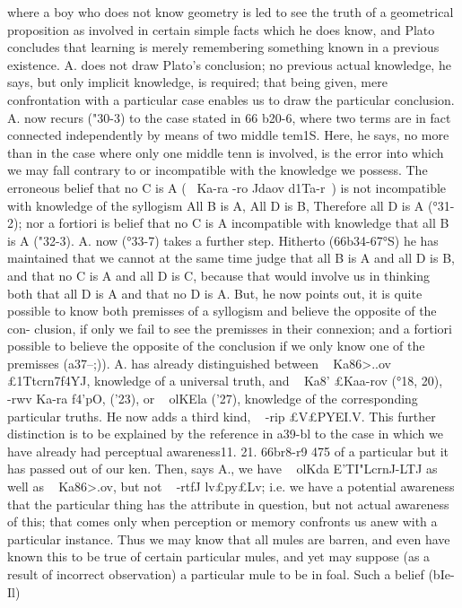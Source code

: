 {{{{{{where a boy who does not know geometry is led to see the truth
of a geometrical proposition as involved in certain simple facts
which he does know, and Plato concludes that learning is merely
remembering something known in a previous existence. A. does
not draw Plato's conclusion; no previous actual knowledge, he
says, but only implicit knowledge, is required; that being given,
mere confrontation with a particular case enables us to draw the
particular conclusion.
A. now recurs ("30-3) to the case stated in 66 b20-6, where two
terms are in fact connected independently by means of two middle
tem1S. Here, he says, no more than in the case where only one
middle tenn is involved, is the error into which we may fall
contrary to or incompatible with the knowledge we possess. The
erroneous belief that no C is A (~ Ka-ra -ro Jdaov d1Ta-r~) is not
incompatible with knowledge of the syllogism All B is A, All
D is B, Therefore all D is A (°31-2); nor a fortiori is belief that
no C is A incompatible with knowledge that all B is A ("32-3).
A. now (°33-7) takes a further step. Hitherto (66b34-67°S) he
has maintained that we cannot at the same time judge that all
B is A and all D is B, and that no C is A and all D is C, because
that would involve us in thinking both that all D is A and that
no D is A. But, he now points out, it is quite possible to know
both premisses of a syllogism and believe the opposite of the con-
clusion, if only we fail to see the premisses in their connexion;
and a fortiori possible to believe the opposite of the conclusion if
we only know one of the premisses (a37--{;)).
A. has already distinguished between ~ Ka86>..ov £1Ttcrn7f4YJ,
knowledge of a universal truth, and ~ Ka8' £Kaa-rov (°18, 20), ~ -rwv
Ka-ra f4'pO, ('23), or ~ olKEla ('27), knowledge of the corresponding
particular truths. He now adds a third kind, ~ -rip £V£PYEI.V. This
further distinction is to be explained by the reference in a39-bl
to the case in which we have already had perceptual awareness11. 21. 66br8-r9
475
of a particular but it has passed out of our ken. Then, says A.,
we have ~ olKda E'TI"Lcrn}J-LTJ as well as ~ Ka86>.ov, but not ~ -rtfJ
lv£py£Lv; i.e. we have a potential awareness that the particular
thing has the attribute in question, but not actual awareness of
this; that comes only when perception or memory confronts us
anew with a particular instance. Thus we may know that all
mules are barren, and even have known this to be true of certain
particular mules, and yet may suppose (as a result of incorrect
observation) a particular mule to be in foal. Such a belief (bIe-Il)
}}}}}}

